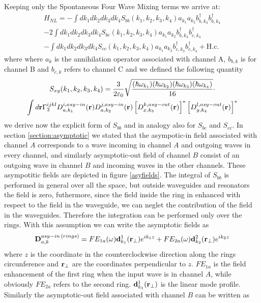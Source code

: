 Keeping only the Spontaneous Four Wave Mixing terms we arrive at:
\begin{multline}H_{NL} = -\int dk_1dk_2dk_3dk_4S_{bb}(k_1,k_2,k_3,k_4)a_{k_1}a_{k_2}b_{b,k_3}^\dagger b_{b,k_4}^\dagger \\-2\int dk_1dk_2dk_3dk_4S_{bc}(k_1,k_2,k_3,k_4)a_{k_1}a_{k_2}b_{b,k_3}^\dagger b_{c,k_4}^\dagger\\ -\int dk_1dk_2dk_3dk_4S_{cc}(k_1,k_2,k_3,k_4)a_{k_1}a_{k_2}b_{c,k_3}^\dagger b_{c,k_4}^\dagger +\text{H.c.}\end{multline}
where where $a_k$ is the annihilation operator associated with channel A, $b_{b,k}$ is for channel B and $b_{c,k}$ refers to channel C and we defined the following quantity
\begin{multline}\label{S}
S_{xy}(k_1,k_2,k_3,k_4) = \frac{3}{2\varepsilon_0}\sqrt{\frac{(\hbar\omega_{k_1})(\hbar\omega_{k_2})(\hbar\omega_{k_3})(\hbar\omega_{k_4})}{16}}\cdot \\ \int d\mathbf{r} \Gamma^{ijkl}_3D^{i,asy-in}_{a,k_1}(\mathbf{r})D^{j,asy-in}_{a,k_2}(\mathbf{r})\left[D^{k,asy-out}_{x,k_3}(\mathbf{r})\right]^*\left[D^{l,asy-out}_{y,k_4}(\mathbf{r})\right]^*
\end{multline}
we derive now the explicit form of $S_{bb}$ and in analogy also for $S_{bc}$ and $S_{cc}$. In section \ref{section:asymptotic} we stated that the asympotic-in field associated with channel $A$ corresponds to a wave incoming in channel $A$ and outgoing waves in every channel, and similarly asymptotic-out field of channel $B$ consist of an outgoing wave in channel $B$ and incoming waves in the other channels. These asympotitic fields are depicted in figure \ref{asyfields}. The integral of $S_{bb}$ is performed in general over all the space, but outside waveguides and resonators the field is zero, futhermore, since the field inside the ring in enhanced with respect to the field in the waveguide, we can neglet the contribution of the field in the waveguides. Therefore the integration can be performed only over the rings. With this assumption we can write the asymptotic fields as
\begin{equation}\mathbf{D}^{asy-in\,(rings)}_{a,k} = FE_{1a}(\omega) \mathbf{d}^1_{k_1}(\mathbf{r}_\perp)e^{ik_1z} + FE_{2a}(\omega) \mathbf{d}_{k_2}^2(\mathbf{r}_\perp)e^{ik_2z} \end{equation}
where $z$ is the coordinate in the counterclockwise direction along the rings circunference and $\mathbf{r}_\perp$ are the coordinates perpendicular to $z$. $FE_{1a}$ is the field enhancement of the first ring when the input wave is in channel $A$, while obviously $FE_{2a}$ refers to the second ring. $\mathbf{d}^1_{k_1}(\mathbf{r}_\perp)$ is the linear mode profile. Similarly the asymptotic-out field associated with channel $B$ can be written as
